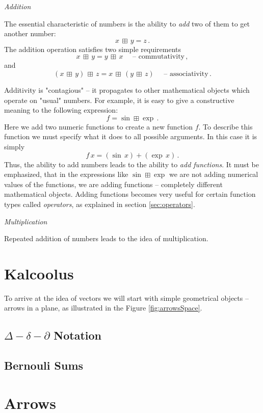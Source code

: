 \begin{flushleft}
	{\it Addition}
\end{flushleft}
The essential characteristic of numbers is the ability to \emph{add} two of them to get another number:
\[
x\,\boxplus\, y = z\,.
\]
The addition operation satisfies two simple requirements
\[
x\,\boxplus\, y = y\,\boxplus\, x\quad\textrm{ -- commutativity}\,,
\]
and
\[
(x\,\boxplus\, y)\,\boxplus\, z = x\,\boxplus\, (y\,\boxplus\, z) \quad\textrm{ -- associativity}\,.
\]


Additivity is "contagious" -- it propagates to other mathematical objects which operate on "usual" numbers. For example, it is easy to give a constructive meaning to the following expression:
\[
f = \sin\boxplus\exp\,.
\]
Here we add two numeric functions to create a new function $f$. To describe this function we must specify what it does to all possible arguments. In this case it is simply
\[
f\,x=(\sin\, x)+(\exp\, x)\,.
\]
Thus, the ability to add numbers leads to the ability to \emph{add functions}. It must be emphasized, that in the expressions like $\sin\boxplus\exp$ we are not adding numerical values of the functions, we are adding functions -- completely different mathematical objects. Adding functions becomes very useful for certain function types called \emph{operators}, as explained in section \ref{sec:operators}.

\begin{flushleft}
	{\it Multiplication}
\end{flushleft}
Repeated addition of numbers leads to the idea of multiplication.


\section{Kalcoolus}

To arrive at the idea of vectors we will start with simple geometrical
objects -- arrows in a plane, as illustrated in the Figure \ref{fig:arrowsSpace}.

\subsection{$\Delta-\delta-\partial$ Notation}

\subsection{Bernouli Sums}

\section{Arrows}

